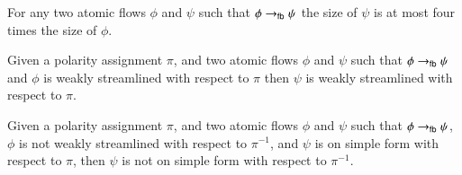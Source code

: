 \begin{lemma}\label{lemma:FourBoxesSize}
For any two atomic flows $\phi$ and $\psi$ such that $\phi\to_{\mathsf{fb}}\psi$ the size of $\psi$ is at most four times the size of $\phi$.
\end{lemma}

\begin{lemma}\label{lemma:FourBoxesStreamlining}
Given a polarity assignment $\pi$, and two atomic flows $\phi$ and $\psi$ such that $\phi\to_{\mathsf{fb}}\psi$ and $\phi$ is weakly streamlined with respect to $\pi$ then $\psi$ is weakly streamlined with respect to $\pi$.
\end{lemma}


\begin{remark}\label{remark:FourBoxesDestroySimpleForm}
Given a polarity assignment $\pi$, and two atomic flows $\phi$ and $\psi$ such that $\phi\to_{\mathsf{fb}}\psi$, $\phi$ is not weakly streamlined with respect to $\pi^{-1}$, and $\psi$ is on simple form with respect to $\pi$, then $\psi$ is not on simple form with respect to $\pi^{-1}$.
\end{remark}
